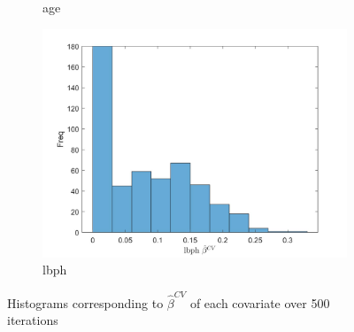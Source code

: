 \documentclass{article}
\begin{document}
\begin{figure}[ht]
\begin{subfigure}[b]{0.5\linewidth}
			\caption{age} 
			\label{age} 
		\end{subfigure}%
		\begin{subfigure}[b]{0.5\linewidth}
			\centering
			\includegraphics[width=0.75\linewidth]{figures/q8_5.jpg} 
			\caption{lbph} 
			\label{lbph} 
		\end{subfigure} 
		\caption{Histograms corresponding to $ \hat{\beta}^{CV} $ of each covariate over 500 iterations}
		\label{q8_2} 
	\end{figure}
\end{document}
